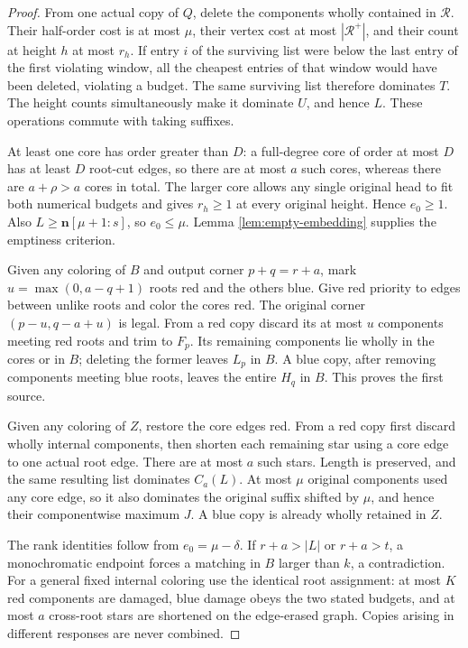 \documentclass[11pt,a4paper]{article}
\newcommand{\nn}{\mathbf n}\newcommand{\mm}{\mathbf m}
\theoremstyle{definition}
\begin{document}
\begin{proof}
From one actual copy of $Q$, delete the components wholly contained in $\mathcal R$. Their half-order cost is at most $\mu$, their vertex cost at most $|\mathcal R^+|$, and their count at height $h$ at most $r_h$. If entry $i$ of the surviving list were below the last entry of the first violating window, all the cheapest entries of that window would have been deleted, violating a budget. The same surviving list therefore dominates $T$. The height counts simultaneously make it dominate $U$, and hence $L$. These operations commute with taking suffixes.

At least one core has order greater than $D$: a full-degree core of order at most $D$ has at least $D$ root-cut edges, so there are at most $a$ such cores, whereas there are $a+\rho>a$ cores in total. The larger core allows any single original head to fit both numerical budgets and gives $r_h\ge1$ at every original height. Hence $e_0\ge1$. Also $L\ge\nn[\mu+1:s]$, so $e_0\le\mu$. Lemma \ref{lem:empty-embedding} supplies the emptiness criterion.

Given any coloring of $B$ and output corner $p+q=r+a$, mark $u=\max(0,a-q+1)$ roots red and the others blue. Give red priority to edges between unlike roots and color the cores red. The original corner $(p-u,q-a+u)$ is legal. From a red copy discard its at most $u$ components meeting red roots and trim to $F_p$. Its remaining components lie wholly in the cores or in $B$; deleting the former leaves $L_p$ in $B$. A blue copy, after removing components meeting blue roots, leaves the entire $H_q$ in $B$. This proves the first source.

Given any coloring of $Z$, restore the core edges red. From a red copy first discard wholly internal components, then shorten each remaining star using a core edge to one actual root edge. There are at most $a$ such stars. Length is preserved, and the same resulting list dominates $C_a(L)$. At most $\mu$ original components used any core edge, so it also dominates the original suffix shifted by $\mu$, and hence their componentwise maximum $J$. A blue copy is already wholly retained in $Z$.

The rank identities follow from $e_0=\mu-\delta$. If $r+a>|L|$ or $r+a>t$, a monochromatic endpoint forces a matching in $B$ larger than $k$, a contradiction. For a general fixed internal coloring use the identical root assignment: at most $K$ red components are damaged, blue damage obeys the two stated budgets, and at most $a$ cross-root stars are shortened on the edge-erased graph. Copies arising in different responses are never combined.
\end{proof}
\end{document}
